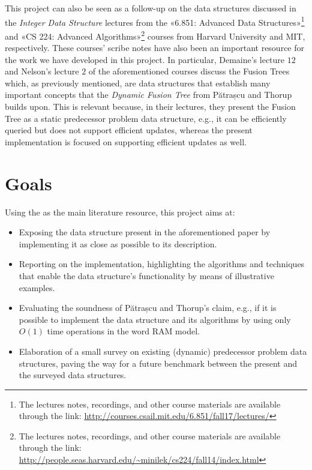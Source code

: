 This project can also be seen as a follow-up on the data structures discussed in the \textit{Integer Data Structure} lectures from the «6.851: Advanced Data Structures»\footnote{The lectures notes, recordings, and other course materials are available through the link: \url{http://courses.csail.mit.edu/6.851/fall17/lectures/}} and «CS 224: Advanced Algorithms»\footnote{The lectures notes, recordings, and other course materials are available through the link: \url{http://people.seas.harvard.edu/~minilek/cs224/fall14/index.html}} courses from Harvard University and MIT, respectively.
These courses' scribe notes have also been an important resource for the work we have developed in this project.
In particular, Demaine's lecture $12$ \cite{erikdemainelec12} and Nelson's lecture $2$ \cite{nelsonjelanilec2} of the aforementioned courses discuss the Fusion Trees which, as previously mentioned, are data structures that establish many important concepts that the \textit{Dynamic Fusion Tree} from Pătrașcu and Thorup builds upon. 
This is relevant because, in their lectures, they present the Fusion Tree as a static predecessor problem data structure, e.g., it can be efficiently queried but does not support efficient updates, whereas the present implementation is focused on supporting efficient updates as well.

\section{Goals}

Using the \cite{patrascu2014dynamic} as the main literature resource, this project aims at:
\begin{itemize}
    \item
    Exposing the data structure present in the aforementioned paper by implementing it as close as possible to its description.
    
    \item
    Reporting on the implementation, highlighting the algorithms and techniques that enable the data structure's functionality by means of illustrative examples.
    
    \item
    Evaluating the soundness of Pătrașcu and Thorup's claim, e.g., if it is possible to implement the data structure and its algorithms by using only $O(1)$ time operations in the word RAM model.
    
    \item
    Elaboration of a small survey on existing (dynamic) predecessor problem data structures, paving the way for a future benchmark between the present and the surveyed data structures.
\end{itemize}

